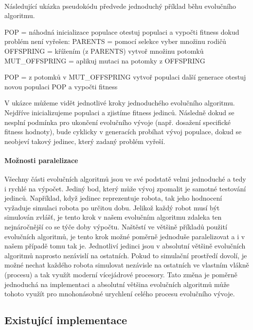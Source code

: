 \paragraph{}
Následující ukázka pseudokódu předvede jednoduchý příklad běhu evolučního
algoritmu. 
\pagebreak
\begin{code}
POP = náhodná inicializace populace
otestuj populaci a vypočti fitness
dokud problém není vyřešen:
    PARENTS = pomocí selekce vyber množinu rodičů
    OFFSPRING = křížením (z PARENTS) vytvoř množinu potomků
    MUT_OFFSPRING = aplikuj mutaci na potomky z OFFSPRING

    POP = z potomků v MUT_OFFSPRING vytvoř populaci další generace
    otestuj novou populaci POP a vypočti fitness
\end{code}

V ukázce můžeme vidět jednotlivé kroky jednoduchého evolučního algoritmu.
Nejdříve inicializujeme populaci a zjistíme fitness jedinců. Následně dokud se
nesplní podmínka pro ukončení evolučního vývoje (např. dosažení specifické
fitness hodnoty), bude cyklicky v generacích probíhat vývoj populace, dokud se
neobjeví takový jedinec, který zadaný problém vyřeší.

\paragraph{Možnosti paralelizace}
Všechny části evolučních algoritmů jsou ve své podstatě velmi jednoduché a tedy
i rychlé na výpočet. Jediný bod, který může vývoj zpomalit je samotné testování
jedinců. Například, když jedinec reprezentuje robota, tak jeho hodnocení
vyžaduje simulaci robota po určitou dobu. Jelikož každý robot musí být
simulován zvlášť, je tento krok v našem evolučním algoritmu zdaleka ten
nejnáročnější co se týče doby výpočtu. Naštěstí ve většině příkladů použití
evolučních algoritmů, je tento krok možné poměrně jednoduše paralelizovat a i v
našem případě tomu tak je. Jednotliví jedinci jsou v absolutní většině
evolučních algoritmů naprosto nezávislí na ostatních. Pokud to simulační
prostředí dovolí, je možné nechat každého robota simulovat nezávisle na
ostatních ve vlastním vlákně (procesu) a tak využít moderní vícejádrové
procesory. Tato změna je poměrně jednoduchá na implementaci a absolutní většina
evolučních algoritmů může tohoto využít pro mnohonásobné urychlení celého
procesu evolučního vývoje.

\subsection{Existující implementace} \label{EA-impl}

